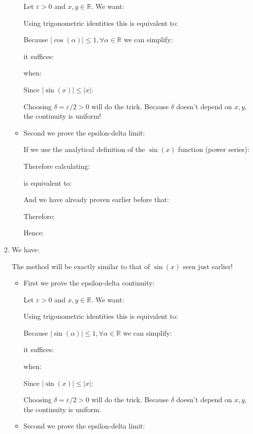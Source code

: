 \begin{enumerate}
\begin{itemize}
			Let $\varepsilon>0$ and $x, y \in \mathbb{R}$. We want:
			
			Using trigonometric identities this is equivalent to:
			
			Because $| \cos (\alpha)| \leqslant 1, \forall \alpha \in \mathbb{R}$ we can simplify:
			
			it suffices:
			
			when:
			
			Since $|\sin (x)| \leq|x|$:
			
			Choosing $\delta=\varepsilon/2>0$ will do the trick. Because $\delta$ doesn't depend on $x, y$, the continuity is uniform!
			
			\item Second we prove the epsilon-delta limit:
			
			If we use the analytical definition of the $\sin(x)$ function (power series):
			
			Therefore calculating:
			
			is equivalent to:
			
			And we have already proven earlier before that:
			
			Therefore:
			
			Hence:
			
		\end{itemize}
		
		\item We have:
		
		
		The method will be exactly similar to that of $\sin(x)$ seen just earlier!
		
		\begin{itemize}
			\item First we prove the epsilon-delta continuity:
			
			Let $\varepsilon>0$ and $x, y \in \mathbb{R}$. We want:
			
			Using trigonometric identities this is equivalent to:
			
			Because $| \sin(\alpha)| \leqslant 1, \forall \alpha \in \mathbb{R}$ we can simplify:
			
			it suffices:
			
			when:
			
			Since $|\sin (x)| \leq|x|$:
			
			Choosing $\delta=\varepsilon/2>0$ will do the trick. Because $\delta$ doesn't depend on $x, y$, the continuity is uniform.
			
			\item Second we prove the epsilon-delta limit:
			

\end{itemize}
\end{enumerate}
